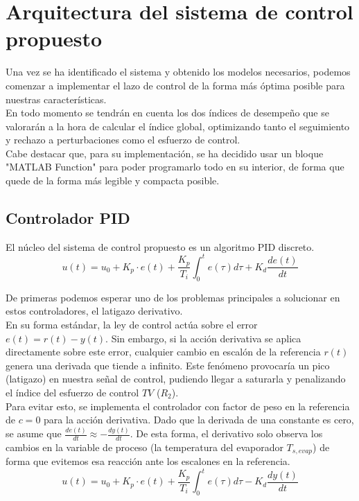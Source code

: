 \documentclass[12pt,a4paper]{article}
\begin{document}
	\section{Arquitectura del sistema de control propuesto}
	
	Una vez se ha identificado el sistema y obtenido los modelos necesarios, podemos comenzar a implementar el lazo de control de la forma más óptima posible para nuestras características.\\
	En todo momento se tendrán en cuenta los dos índices de desempeño que se valorarán a la hora de calcular el índice global, optimizando tanto el seguimiento y rechazo a perturbaciones como el esfuerzo de control. \\
	
	Cabe destacar que, para su implementación, se ha decidido usar un bloque "MATLAB Function" para poder programarlo todo en su interior, de forma que quede de la forma más legible y compacta posible. \\
	
	 
	\subsection{Controlador PID}
	
	El núcleo del sistema de control propuesto es un algoritmo PID discreto.
	$$u(t) = u_0 + K_p \cdot e(t) + \frac{K_p}{T_i} \int_{0}^{t} e(\tau) d\tau + K_d \frac{de(t)}{dt}$$  
	
	De primeras podemos esperar uno de los problemas principales a solucionar en estos controladores, el latigazo derivativo.\\ 
	En su forma estándar, la ley de control actúa sobre el error $e(t) = r(t) - y(t)$. Sin embargo, si la acción derivativa se aplica directamente sobre este error, cualquier cambio en escalón de la referencia $r(t)$ genera una derivada que tiende a infinito. Este fenómeno provocaría un pico (latigazo) en nuestra señal de control, pudiendo llegar a saturarla y penalizando el índice del esfuerzo de control $TV$ ($R_2$). \\
	
	Para evitar esto, se implementa el controlador con factor de peso en la referencia de $c=0$ para la acción derivativa. Dado que la derivada de una constante es cero, se asume que $\frac{de(t)}{dt} \approx -\frac{dy(t)}{dt}$. De esta forma, el derivativo solo observa los cambios en la variable de proceso (la temperatura del evaporador $T_{s,evap}$) de forma que evitemos esa reacción ante los escalones en la referencia.\\
	$$u(t) = u_0 + K_p \cdot e(t) + \frac{K_p}{T_i} \int_{0}^{t} e(\tau) d\tau - K_d \frac{dy(t)}{dt}$$
	
\end{document}
